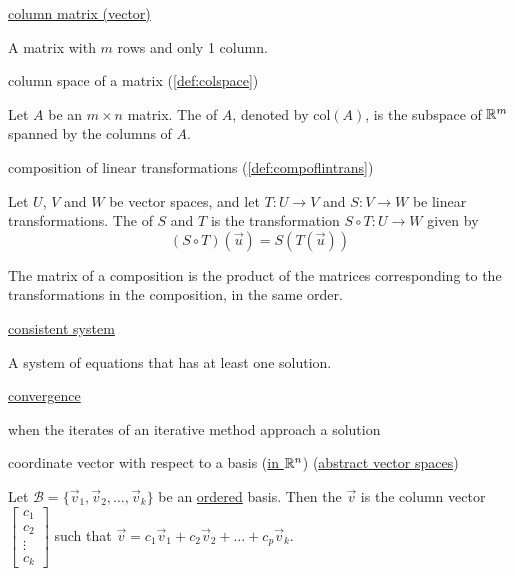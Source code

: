 \documentclass{ximera}
\begin{document}
\href{https://ximera.osu.edu/linearalgebradzv3/LinearAlgebraInteractiveIntro/MAT-0010/main}{column matrix (vector)}
\begin{expandable}{}{}
    A matrix with $m$ rows and only 1 column.
\end{expandable}

column space of a matrix (\ref{def:colspace})
\begin{expandable}{}{}
    Let $A$ be an $m\times n$ matrix.  The  of $A$, denoted by $\mbox{col}(A)$, is the subspace of $\mathbb{R}^m$ spanned by the columns of $A$.
\end{expandable}

composition of linear transformations (\ref{def:compoflintrans})
\begin{expandable}{}{}
    Let $U$, $V$ and $W$ be vector spaces, and let $T:U\rightarrow V$ and $S:V\rightarrow W$ be linear transformations.  The  of $S$ and $T$ is the transformation $S\circ T:U\rightarrow W$ given by
$$(S\circ T)(\vec{u})=S(T(\vec{u}))$$

The matrix of a composition is the product of the matrices corresponding to the transformations in the composition, in the same order.
\end{expandable}

\href{https://ximera.osu.edu/linearalgebradzv3/LinearAlgebraInteractiveIntro/SYS-0010/main}{consistent system}
\begin{expandable}{}{}
    A system of equations that has at least one solution.
\end{expandable}

\href{https://ximera.osu.edu/linearalgebradzv3/LinearAlgebraInteractiveIntro/SYS-0040/main}{convergence}
\begin{expandable}{}{}
    when the iterates of an iterative method approach a solution
\end{expandable}

coordinate vector with respect to a basis (\href{https://ximera.osu.edu/linearalgebradzv3/LinearAlgebraInteractiveIntro/VSP-0030/main}{in $\mathbb{R}^n$}) (\href{https://ximera.osu.edu/linearalgebradzv3/LinearAlgebraInteractiveIntro/VSP-0060/main}{abstract vector spaces})
\begin{expandable}{}{}
    Let $\mathcal{B} = \{\vec{v}_1, \vec{v}_2,\ldots ,\vec{v}_k\}$ be an \underline{ordered} basis.  Then the  $\vec{v}$ is the  column vector $\begin{bmatrix}c_1\\ c_2\\ \vdots \\c_k\end{bmatrix}$ such that $\vec{v} = c_1\vec{v}_1+c_2\vec{v}_2+\ldots +c_p\vec{v}_k$.
\end{expandable}
\end{document}
